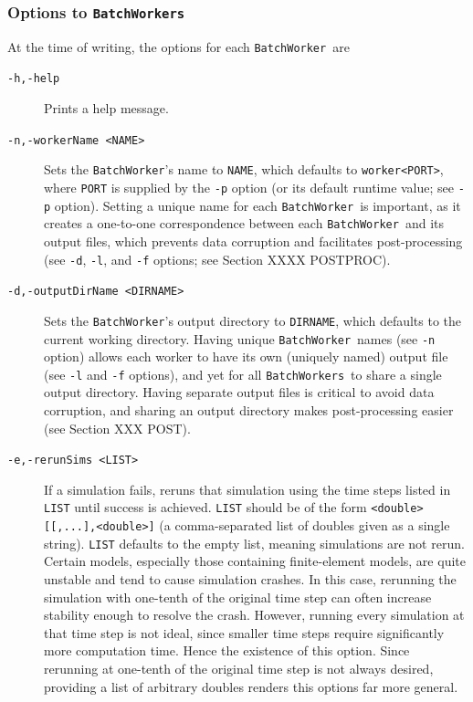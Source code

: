 \documentclass{article}
\newcommand{\BW}{{\tt BatchWorker}}
\newcommand{\BWs}{{\tt BatchWorkers}}
\begin{document}
\subsubsection{Options to \BWs}

At the time of writing, the options for each \BW\ are

\begin{description}

\item[{\tt -h,-help} ] \mbox{}

Prints a help message.

\item[{\tt -n,-workerName <NAME>} ] \mbox{}

Sets the \BW's name to {\tt NAME}, which defaults to {\tt worker<PORT>}, where {\tt PORT} is supplied by the {\tt -p} option (or its default runtime value; see {\tt -p} option). Setting a unique name for each \BW\ is important, as it creates a one-to-one correspondence between each \BW\ and its output files, which prevents data corruption and facilitates post-processing (see {\tt -d}, {\tt -l}, and {\tt -f} options; see Section XXXX POSTPROC).

\item[{\tt -d,-outputDirName <DIRNAME>} ] \mbox{}

Sets the \BW's output directory to {\tt DIRNAME}, which defaults to the current working directory. Having unique \BW\ names (see {\tt -n} option) allows each worker to have its own (uniquely named) output file (see {\tt -l} and {\tt -f} options), and yet for all \BWs\ to share a single output directory. Having separate output files is critical to avoid data corruption, and sharing an output directory makes post-processing easier (see Section XXX POST).

\item[{\tt -e,-rerunSims <LIST>} ] \mbox{}

If a simulation fails, reruns that simulation using the time steps listed in {\tt LIST} until success is achieved. {\tt LIST} should be of the form {\tt <double>[[,...],<double>]} (a comma-separated list of doubles given as a single string). {\tt LIST} defaults to the empty list, meaning simulations are not rerun. Certain models, especially those containing finite-element models, are quite unstable and tend to cause simulation crashes. In this case, rerunning the simulation with one-tenth of the original time step can often increase stability enough to resolve the crash. However, running every simulation at that time step is not ideal, since smaller time steps require significantly more computation time. Hence the existence of this option. Since rerunning at one-tenth of the original time step is not always desired, providing a list of arbitrary doubles renders this options far more general.


\end{description}
\end{document}
